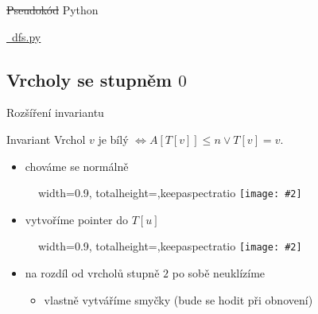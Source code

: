 \documentclass[czech]{beamer}
\makeatletter
\newcommand{\fitimage}[2][\@nil]{
	\begin{figure}
		\begin{adjustbox}{width=0.9\textwidth, totalheight=\textheight-2\baselineskip-2\baselineskip,keepaspectratio}
			\texttt{[image: \#2]}
		\end{adjustbox}
		\def\tmp{#1}%
	 \ifx\tmp\@nnil
			\else
			\caption{#1}
		\fi
	\end{figure}
}
\makeatother
\begin{document}
	\begin{frame}{\st{Pseudokód} Python}
		\begin{center}
			\href{run:dfs.py}{\faPython\ dfs.py}
		\end{center}
	\end{frame}

	\subsection{Vrcholy se stupněm $0$}

	\begin{frame}{Rozšíření invariantu}
		\begin{block}{Invariant}
			Vrchol $v$ je bílý $\iff A[T[v]] \le n \lor T\left[v\right] = v$.
		\end{block}
		\begin{minipage}[t]{0.5\textwidth}
				\vspace{0pt}
				\begin{itemize}
					\item chováme se normálně
				\end{itemize}
				\fitimage{images/deg0-2.png}
		\end{minipage}%
		\hfill
		\begin{minipage}[t]{0.5\textwidth}
			\vspace{0pt}
			\begin{itemize}
				\item vytvoříme pointer do $T[u]$
			\end{itemize}
			\fitimage{images/deg0-1.png}
		\end{minipage}
		\vfill
		\begin{itemize}
			\item na rozdíl od vrcholů stupně $2$ po sobě neuklízíme
			\begin{itemize}
				\item vlastně vytváříme smyčky (bude se hodit při obnovení)
			\end{itemize}
		\end{itemize}
	\end{frame}
\end{document}
